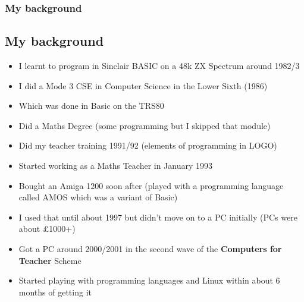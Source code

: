 \documentclass{beamer}
\begin{document}
\begin{frame}
\frametitle{My background}
\subsection{My background}

\begin{itemize}
  
\item I learnt to program in Sinclair BASIC on a 48k ZX Spectrum around 1982/3
  
\item I did a Mode 3 CSE in Computer Science in the Lower Sixth (1986)
  
\item Which was done in Basic on the TRS80
  
\item Did a Maths Degree (some programming but I skipped that module)

\item Did my teacher training 1991/92 (elements of programming in LOGO)

\item Started working as a Maths Teacher in January 1993
  
\item Bought an Amiga 1200 soon after (played with a programming language called AMOS which was a variant of Basic) 
  
\item I used that until about 1997 but didn't move on to a PC initially (PCs were about \pounds1000+)

\item Got a PC around 2000/2001 in the second wave of the \textbf{Computers for Teacher} Scheme

\item Started playing with programming languages and Linux within about 6 months of getting it
\end{itemize}

\end{frame}
\end{document}
